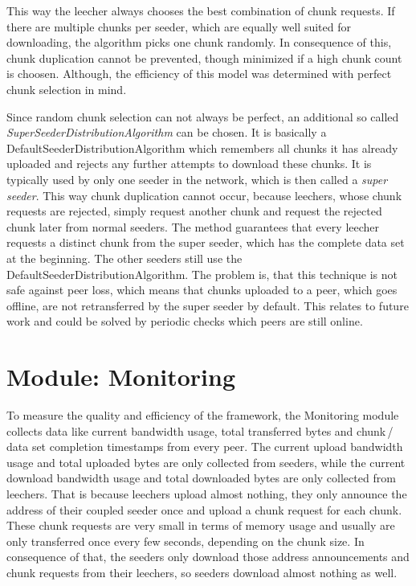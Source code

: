 This way the leecher always chooses the best combination of chunk requests. If there are multiple chunks per seeder, which are equally well suited for downloading, the algorithm picks one chunk randomly. In consequence of this, chunk duplication cannot be prevented, though minimized if a high chunk count is choosen. Although, the efficiency of this model was determined with perfect chunk selection in mind. 

Since random chunk selection can not always be perfect, an additional so called \emph{SuperSeederDistributionAlgorithm} can be chosen. It is basically a DefaultSeederDistributionAlgorithm which remembers all chunks it has already uploaded and rejects any further attempts to download these chunks. It is typically used by only one seeder in the network, which is then called a \emph{super seeder}. This way chunk duplication cannot occur, because leechers, whose chunk requests are rejected, simply request another chunk and request the rejected chunk later from normal seeders. The method guarantees that every leecher requests a distinct chunk from the super seeder, which has the complete data set at the beginning. The other seeders still use the DefaultSeederDistributionAlgorithm. The problem is, that this technique is not safe against peer loss, which means that chunks uploaded to a peer, which goes offline, are not retransferred by the super seeder by default. This relates to future work and could be solved by periodic checks which peers are still online.

\cleardoublepage
\section{Module: Monitoring}
\label{sec:monitoring}
To measure the quality and efficiency of the framework, the Monitoring module collects data like current bandwidth usage, total transferred bytes and chunk\,/\,data set completion timestamps from every peer. The current upload bandwidth usage and total uploaded bytes are only collected from seeders, while the current download bandwidth usage and total downloaded bytes are only collected from leechers. That is because leechers upload almost nothing, they only announce the address of their coupled seeder once and upload a chunk request for each chunk. These chunk requests are very small in terms of memory usage and usually are only transferred once every few seconds, depending on the chunk size. In consequence of that, the seeders only download those address announcements and chunk requests from their leechers, so seeders download almost nothing as well.

